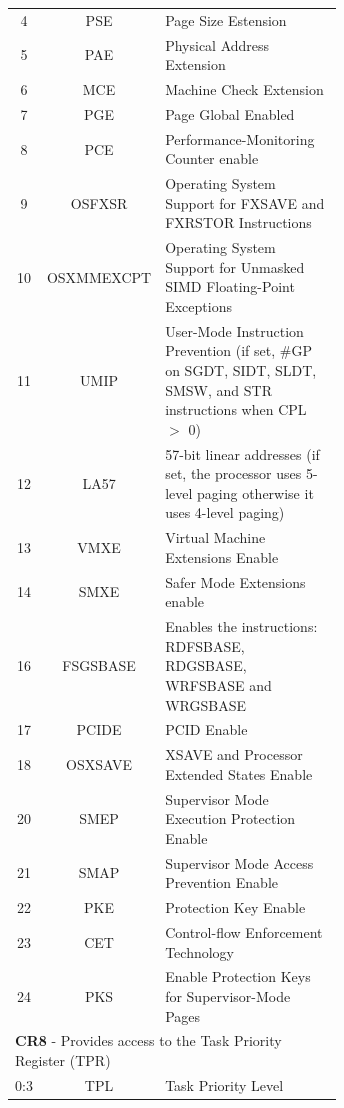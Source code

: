 \documentclass{article}
\begin{document}
\begin{longtable}{|c|c|m{0.65\linewidth}|}
  4 & PSE & Page Size Estension \\
  5 & PAE & Physical Address Extension \\
  6 & MCE & Machine Check Extension \\
  7 & PGE & Page Global Enabled \\
  8 & PCE & Performance-Monitoring Counter enable \\
  9 & OSFXSR & Operating System Support for FXSAVE and FXRSTOR Instructions \\
  10 & OSXMMEXCPT & Operating System Support for Unmasked SIMD Floating-Point Exceptions \\
  11 & UMIP & User-Mode Instruction Prevention (if set, \#GP on SGDT, SIDT, SLDT, SMSW, and STR instructions when CPL $>$ 0) \\
  12 & LA57 & 57-bit linear addresses (if set, the processor uses 5-level paging otherwise it uses 4-level paging) \\
  13 & VMXE & Virtual Machine Extensions Enable \\
  14 & SMXE & Safer Mode Extensions enable \\
  16 & FSGSBASE & Enables the instructions: RDFSBASE, RDGSBASE, WRFSBASE and WRGSBASE \\
  17 & PCIDE & PCID Enable \\
  18 & OSXSAVE & XSAVE and Processor Extended States Enable \\
  20 & SMEP & Supervisor Mode Execution Protection Enable \\
  21 & SMAP & Supervisor Mode Access Prevention Enable \\
  22 & PKE & Protection Key Enable \\
  23 & CET & Control-flow Enforcement Technology \\
  24 & PKS & Enable Protection Keys for Supervisor-Mode Pages \\
  \hline \multicolumn{3}{|l|}{\textbf{CR8} - Provides access to the Task Priority Register (TPR)} \\ \hline
  0:3 & TPL & Task Priority Level \\
\end{longtable}

\cite[Chapter~2.5]{sdm3}

\end{document}
